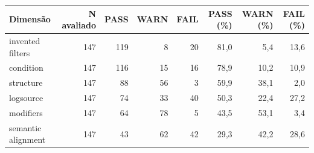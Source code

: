 \begin{tabular}{lrrrrrrr}
\toprule
Dimensão & N avaliado & PASS & WARN & FAIL & PASS (\%) & WARN (\%) & FAIL (\%) \\
\midrule
invented filters & 147 & 119 & 8 & 20 & 81,0 & 5,4 & 13,6 \\
condition & 147 & 116 & 15 & 16 & 78,9 & 10,2 & 10,9 \\
structure & 147 & 88 & 56 & 3 & 59,9 & 38,1 & 2,0 \\
logsource & 147 & 74 & 33 & 40 & 50,3 & 22,4 & 27,2 \\
modifiers & 147 & 64 & 78 & 5 & 43,5 & 53,1 & 3,4 \\
semantic alignment & 147 & 43 & 62 & 42 & 29,3 & 42,2 & 28,6 \\
\bottomrule
\end{tabular}
